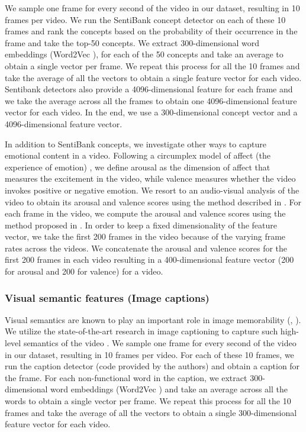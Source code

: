 \documentclass[sigconf]{acmart}
\begin{document}
We sample one frame for every second of the video in our dataset, resulting in 10 frames per video.
We run the SentiBank concept detector on each of these 10 frames and rank the concepts based on the probability of their occurrence in the frame and take the top-50 concepts.
We extract 300-dimensional word embeddings (Word2Vec \cite{word2vec}), for each of the 50 concepts and take an average to obtain a single vector per frame.
We repeat this process for all the 10 frames and take the average of all the vectors to obtain a single feature vector for each video.
Sentibank detectors also provide a 4096-dimensional feature for each frame and we take the average across all the frames to obtain one 4096-dimensional feature vector for each video.
In the end, we use a 300-dimensional concept vector and a 4096-dimensional feature vector.

In addition to SentiBank concepts, we investigate other ways to capture emotional content in a video. 
Following a circumplex model of affect (the experience of emotion) \cite{affect-model}, we define arousal as the dimension of affect that measures the excitement in the video, while valence measures whether the video invokes positive or negative emotion.
We resort to an audio-visual analysis of the video to obtain its arousal and valence scores using the method described in \cite{affect}.
For each frame in the video, we compute the arousal and valence scores using the method proposed in \cite{affect}.
In order to keep a fixed dimensionality of the feature vector, we take the first 200 frames in the video because of the varying frame rates across the videos.
We concatenate the arousal and valence scores for the first 200 frames in each video resulting in a 400-dimensional feature vector (200 for arousal and 200 for valence) for a video.

\subsubsection{Visual semantic features (Image captions)}
\label{sem-feat}
Visual semantics are known to play an important role in image memorability (\cite{sem-mem}, \cite{squalli_2017_deep}).
We utilize the state-of-the-art research in image captioning to capture such high-level semantics of the video \cite{caption-feat}.
We sample one frame for every second of the video in our dataset, resulting in 10 frames per video.
For each of these 10 frames, we run the caption detector (code provided by the authors) and obtain a caption for the frame.
For each non-functional word in the caption, we extract 300-dimensional word embeddings (Word2Vec \cite{word2vec}) and take an average across all the words to obtain a single vector per frame.
We repeat this process for all the 10 frames and take the average of all the vectors to obtain a single 300-dimensional feature vector for each video.
\end{document}
